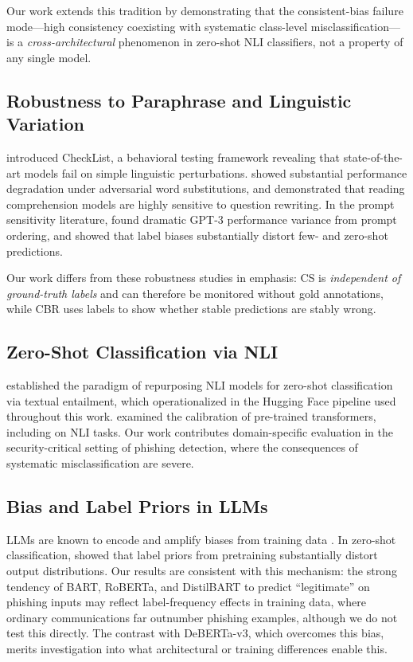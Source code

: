 \documentclass[11pt]{article}
\begin{document}
Our work extends this tradition by demonstrating that the consistent-bias failure mode---high consistency coexisting with systematic class-level misclassification---is a \textit{cross-architectural} phenomenon in zero-shot NLI classifiers, not a property of any single model.

\subsection{Robustness to Paraphrase and Linguistic Variation}

\citet{ribeiro2020beyond} introduced CheckList, a behavioral testing framework revealing that state-of-the-art models fail on simple linguistic perturbations. \citet{garg2020bae} showed substantial performance degradation under adversarial word substitutions, and \citet{khashabi2020more} demonstrated that reading comprehension models are highly sensitive to question rewriting. In the prompt sensitivity literature, \citet{lu2021fantastically} found dramatic GPT-3 performance variance from prompt ordering, and \citet{zhao2021calibrate} showed that label biases substantially distort few- and zero-shot predictions.

Our work differs from these robustness studies in emphasis: CS is \textit{independent of ground-truth labels} and can therefore be monitored without gold annotations, while CBR uses labels to show whether stable predictions are stably wrong.

\subsection{Zero-Shot Classification via NLI}

\citet{yin2019benchmarking} established the paradigm of repurposing NLI models for zero-shot classification via textual entailment, which \citet{wolf2020transformers} operationalized in the Hugging Face pipeline used throughout this work. \citet{desai2020calibration} examined the calibration of pre-trained transformers, including on NLI tasks. Our work contributes domain-specific evaluation in the security-critical setting of phishing detection, where the consequences of systematic misclassification are severe.

\subsection{Bias and Label Priors in LLMs}

LLMs are known to encode and amplify biases from training data \citep{bolukbasi2016man,sheng2019woman,bender2021dangers}. In zero-shot classification, \citet{zhao2021calibrate} showed that label priors from pretraining substantially distort output distributions. Our results are consistent with this mechanism: the strong tendency of BART, RoBERTa, and DistilBART to predict ``legitimate'' on phishing inputs may reflect label-frequency effects in training data, where ordinary communications far outnumber phishing examples, although we do not test this directly. The contrast with DeBERTa-v3, which overcomes this bias, merits investigation into what architectural or training differences enable this.
\end{document}

